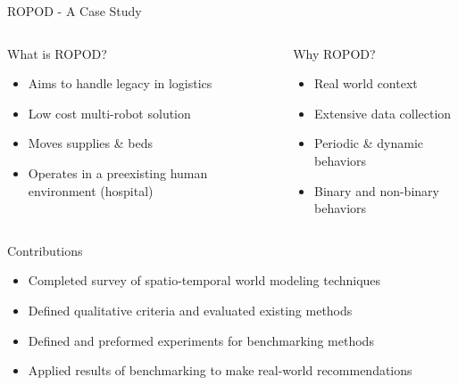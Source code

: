 \documentclass{beamer}
\begin{document}
\begin{frame}[t]{ROPOD - A Case Study}
  \begin{columns}[t]

    \begin{block}{What is ROPOD?}
      \begin{itemize}
        \item Aims to handle legacy in logistics
        \item Low cost multi-robot solution
        \item Moves supplies \& beds
        \item Operates in a preexisting human environment (hospital)
      \end{itemize}
    \end{block}

    \begin{block}{Why ROPOD?}
      \begin{itemize}
        \item Real world context
        \item Extensive data collection
        \item Periodic \& dynamic behaviors
        \item Binary and non-binary behaviors
      \end{itemize}
    \end{block}
  \end{columns}
\end{frame}




\begin{frame}[t]{Contributions}

  \begin{itemize}
    \setlength\itemsep{1em}
    \item Completed survey of spatio-temporal world modeling techniques
    \item Defined qualitative criteria and evaluated existing methods
    \item Defined and preformed experiments for benchmarking methods
    \item Applied results of benchmarking to make real-world recommendations
  \end{itemize}

\end{frame}
\end{document}
